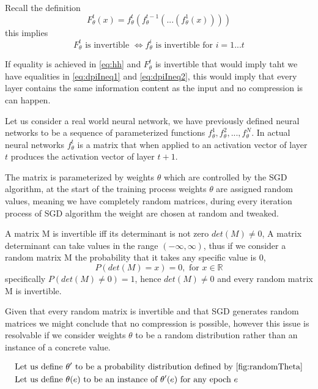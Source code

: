 Recall the definition
\begin{equation*}
  F_{\theta}^t(x) = f_{\theta}^t(f_{\theta}^{t-1}(...(f_{\theta}^1(x))))
\end{equation*}
this implies 
\begin{equation*}
  F_\theta^t \text{ is invertible } \iff f_\theta^i \text{ is invertible
  for } i = 1...t
\end{equation*}

If equality is achieved in \autoref{eq:hh} and $F_\theta^t$ is invertible that
would imply taht we have equalities in \autoref{eq:dpiIneq1} and
\autoref{eq:dpiIneq2}, this would imply that every layer contains the same
information content as the input and no compression is can happen.

Let us consider a real world neural network, we have previously defined neural
networks to be a sequence of parameterized functions
$f_{\theta}^1, f_{\theta}^2, ...  ,f_{\theta}^N$. In actual neural networks
$f_\theta^t$ is a matrix that when applied to an activation vector of layer $t$
produces the activation vector of layer $t+1$. 

The matrix is parameterized by weights $\theta$ which are controlled by the SGD
algorithm, at the start of the training process weights $\theta$ are assigned
random values, meaning we have completely random matrices, during every
iteration process of SGD algorithm the weight are chosen at random and
tweaked.

A matrix M is invertible iff its determinant is not zero $det(M) \neq 0$, A
matrix determinant can take values in the range $(-\infty, \infty)$, thus if we
consider a random matrix M the probability that it takes any specific value is
0, 
\begin{equation*}
  P(det(M) = x) = 0, \text{ for } x \in \mathbb{R}
\end{equation*}
specifically $P(det(M) \neq 0) = 1$, hence $det(M) \neq 0$ and every random
matrix M is invertible.

Given that every random matrix is invertible and that SGD generates random
matrices we might conclude that no compression is possible, however this issue
is resolvable if we consider weights $\theta$ to be a random distribution rather
than an instance of a concrete value. 

\begin{align*}
  &\text{Let us define } \theta^\prime \text{ to be a probability distribution
  defined by \autoref{fig:randomTheta}} \\
  &\text{Let us define } \theta(e) \text{ to be an instance of }
  \theta^\prime(e) \text{ for any epoch } e
\end{align*}

